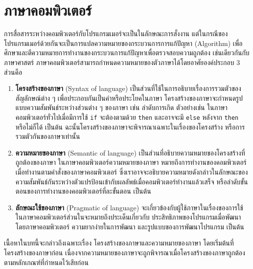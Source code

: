 \chapter{ภาษาคอมพิวเตอร์}
%
\par{
การสื่อสารระหว่างคอมพิวเตอร์กับโปรแกรมเมอร์จะเป็นในลักษณะการสั่งงาน
แต่ในกรณีของโปรแกรมเมอร์ด้วยกันจะเป็นการแปลความหมายของกระบวนการการแก้ปัญหา
(Algorithm)
เพื่อศึกษาและตีความหมายการทำงานของกระบวนการแก้ปัญหาเพื่อตรวจสอบความถูกต้อง
เช่นเดียวกันกับภาษาศาสตร์
ภาษาคอมพิวเตอร์สามารถกำหนดความหมายของตัวภาษาได้โดยอาศัยองค์ประกอบ 
3 ส่วนคือ
\begin{enumerate}
%
\item \textbf{โครงสร้างของภาษา} (Syntax of language) 
เป็นส่วนที่ใช้ในการอธิบายเรื่องการรวมตัวของสัญลักษณ์ต่าง ๆ 
เพื่อประกอบกันเป็นคำหรือประโยคในภาษา 
โครงสร้างของภาษาจะกำหนดรูปแบบความสัมพันธ์ระหว่างส่วนต่าง ๆ 
ของภาษา เช่น ลำดับการเกิด 
ตัวอย่างเช่น ในภาษาคอมพิวเตอร์ทั่วไปเมื่อมีการใช้ \texttt{if} 
จะต้องตามด้วย \texttt{then} และอาจจะมี \texttt{else} 
หลังจาก \texttt{then} หรือไม่ก็ได้ เป็นต้น 
ฉะนั้นโครงสร้างของภาษาจะพิจารณาเฉพาะในเรื่องของโครงสร้าง 
หรือการรวมตัวกันของภาษาเท่านั้น
%
\item \textbf{ความหมายของภาษา}  (Semantic of language)  
เป็นส่วนที่อธิบายความหมายของโครงสร้างที่ถูกต้องของภาษา
ในภาษาคอมพิวเตอร์ความหมายของภาษา
หมายถึงการทำงานของคอมพิวเตอร์เมื่อทำงานตามคำสั่งของภาษาคอมพิวเตอร์
ซึ่งเราอาจจะอธิบายความหมายดังกล่าวในลักษณะของความสัมพันธ์กันระหว่างตัวแปรป้อนเข้ากับผลลัพธ์เมื่อคอมพิวเตอร์ทำงานแล้วเสร็จ
หรือลำดับขั้นตอนของการทำงานของคอมพิวเตอร์ที่ละขั้นตอน เป็นต้น
%
\item \textbf{ลักษณะใช้ของภาษา} (Pragmatic of language) 
จะเกี่ยวข้องกับผู้ใช้ภาษาในเรื่องของการใช้
ในภาษาคอมพิวเตอร์ส่วนในจะหมายถึงประเด็นเกี่ยวกับ
ประสิทธิภาพของโปรแกรมเมื่อพัฒนาโดยภาษาคอมพิวเตอร์
ความยากง่ายในการพัฒนา และรูปแบบของการพัฒนาโปรแกรม เป็นต้น
%
\end{enumerate}
%
เนื้อหาในบทนี้จะกล่าวถึงเฉพาะเรื่อง
โครงสร้างของภาษาและความหมายของภาษา
โดยเริ่มต้นที่โครงสร้างของภาษาก่อน 
เนื่องจากความหมายของภาษาจะถูกพิจารณาเมื่อโครงสร้างของภาษาถูกต้องตามหลักเกณฑ์ที่กำหนดไว้เสียก่อน
}
%
